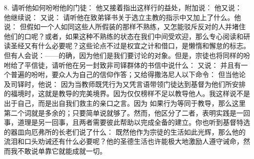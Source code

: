 8. 请听他如何吩咐他的门徒： 他又接着指出这样行的益处，附加说： 他又说： 他继续说： 又说： 请听他在致弟铎书关于选立主教的指示中又加上了什么。他说： 但假如一个人如同这些人所假装的那样不熟练，又怎能驳斥反对的人并堵住他们的口呢？或者，如果这种不熟练的状态在我们中间受欢迎，那么专心阅读和研读圣经又有什么必要呢？这些论点不过是权宜之计和借口，是懒惰和懈怠的标志。但有人会说：——的确，因为他们是我们要讨论的对象。但是，宗徒也将同样的吩咐给了平信徒，请听他在另一封致非司铎群体的书信中说什么： 又说： 并且有一个普遍的吩咐，要众人为自己的信仰作答；又给得撒洛尼人以下命令： 但当他论及司铎时，他说： 因为当教师既凭行为又凭言语带领门徒达到基督为他们所安排的福境时，这就是教导的完美境界。因为仅仅榜样不足以教导他人。我这样说不是出于自己，而是出自我们救主的亲口之言。因为 如果行为等同于教导，那么这里第二个词就是多余的；只要简单说就够了。然而，他区分了二者，表明实践是一回事，道理是另一回事，且两者需要彼此帮助以完成全备的建立。你也听到基督特选的器皿向厄弗所的长老们说了什么： 既然他作为宗徒的生活如此光辉，那么他的流泪和口头劝诫还有什么必要呢？他的圣德生活也许能极大地激励人遵守诫命，然而我不敢说单靠它就能成就一切。\par

